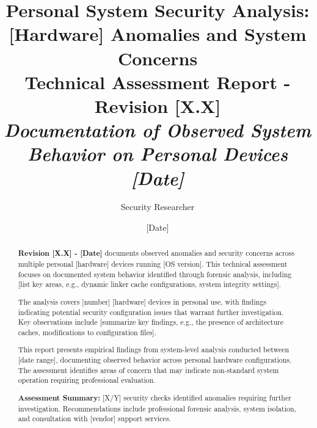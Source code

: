 \documentclass[11pt, a4paper]{article}
\begin{document}
\title{
    \Huge \textbf{Personal System Security Analysis:}\\
    \vspace{0.2cm}
    \LARGE \textbf{[Hardware] Anomalies and System Concerns} \\
    \vspace{1.5cm}
    \large \textbf{Technical Assessment Report - Revision [X.X]} \\
    \vspace{0.5cm}
    \normalsize \textit{Documentation of Observed System Behavior on Personal Devices} \\
    \vspace{0.3cm}
    \normalsize \textit{[Date]}
}
\author{Security Researcher}
\date{[Date]}
\maketitle
\thispagestyle{empty}

\begin{abstract}
\noindent
\textbf{Revision [X.X] - [Date]} documents observed anomalies and security concerns across multiple personal [hardware] devices running [OS version]. This technical assessment focuses on documented system behavior identified through forensic analysis, including [list key areas, e.g., dynamic linker cache configurations, system integrity settings].

\noindent
The analysis covers [number] [hardware] devices in personal use, with findings indicating potential security configuration issues that warrant further investigation. Key observations include [summarize key findings, e.g., the presence of architecture caches, modifications to configuration files].

\noindent
This report presents empirical findings from system-level analysis conducted between [date range], documenting observed behavior across personal hardware configurations. The assessment identifies areas of concern that may indicate non-standard system operation requiring professional evaluation.

\noindent
\textbf{Assessment Summary:} [X/Y] security checks identified anomalies requiring further investigation. Recommendations include professional forensic analysis, system isolation, and consultation with [vendor] support services.
\end{abstract}
\clearpage

\tableofcontents
\clearpage
\end{document}
